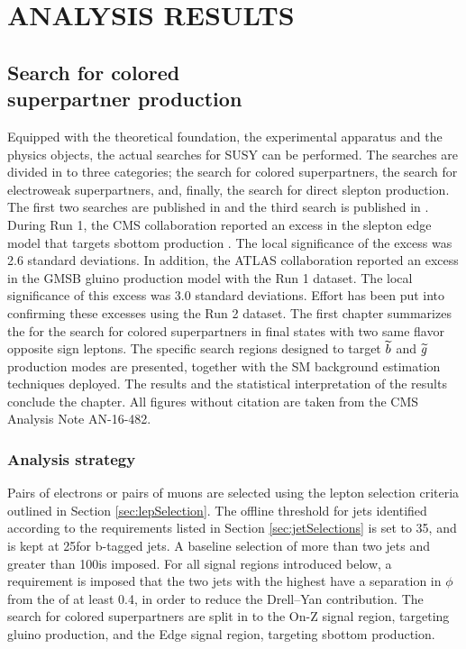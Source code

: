 \part{ANALYSIS RESULTS}
\chapter{Search for colored \\superpartner production}\label{sec:strong}
\noindent\justify
Equipped with the theoretical foundation, the experimental apparatus and the physics objects, the actual searches for SUSY can be performed.
The searches are divided in to three categories; the search for colored superpartners, the search for electroweak superpartners, and, finally, the search for direct slepton production. 
The first two searches are published in \cite{Sirunyan:2017qaj} and the third search is published in \cite{Sirunyan:2018nwe}.  
\newpara
\noindent\justify
During Run 1, the CMS collaboration reported an excess in the slepton edge model that targets sbottom production \cite{Khachatryan:2015lwa}. 
The local significance of the excess was 2.6 standard deviations. 
In addition, the ATLAS collaboration reported an excess in the GMSB gluino production model \cite{Aad:2015wqa} with the Run 1 dataset.  
The local significance of this excess was 3.0 standard deviations. 
Effort has been put into confirming these excesses using the Run 2 dataset.
\newpara
\noindent\justify 
The first chapter summarizes the for the search for colored superpartners in final states with two same flavor opposite sign leptons. 
The specific search regions designed to target $\widetilde{b}$ and $\widetilde{g}$ production modes are presented, together with the SM background estimation techniques deployed. 
The results and the statistical interpretation of the results conclude the chapter. 
All figures without citation are taken from the CMS Analysis Note AN-16-482.
\newpage
\section{Analysis strategy}
\noindent
\justify
Pairs of electrons or pairs of muons are selected using the lepton selection criteria outlined in Section \ref{sec:lepSelection}.  
The offline \pt threshold for jets identified according to the requirements listed in Section \ref{sec:jetSelections} is set to 35\GeV, and is kept at 25\GeV for b-tagged jets.
A baseline selection of more than two jets and \ptmiss greater than 100\GeV is imposed. 
For all signal regions introduced below, a requirement is imposed that the two jets with the highest \pt have a separation in $\phi$ from the \ptmiss of at least 0.4, in order to reduce the Drell--Yan contribution.
The search for colored superpartners are split in to the On-Z signal region, targeting gluino production, and the Edge signal region, targeting sbottom production.

